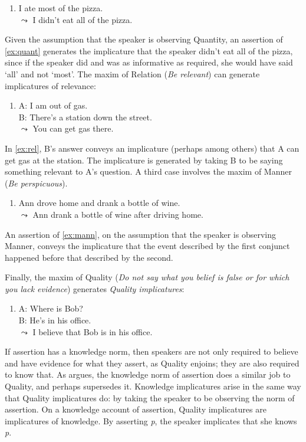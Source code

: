 \documentclass[12pt]{article}
\begin{document}
\begin{enumerate}[resume]
  \item\label{ex:quant}
  I ate most of the pizza.\\
  $\leadsto$ I didn't eat all of the pizza.
\end{enumerate}
%
Given the assumption that the speaker is observing Quantity, an assertion of \ref{ex:quant} generates the implicature that the speaker didn't eat all of the pizza, since if the speaker did and was as informative as required, she would have said `all' and not `most'. The maxim of Relation (\textit{Be relevant}) can generate implicatures of relevance:

\begin{enumerate}[resume]
  \item\label{ex:rel}
    A: I am out of gas.\\
    B: There's a station down the street.\\
    $\leadsto$ You can get gas there.
\end{enumerate}
%
In \ref{ex:rel}, B's answer conveys an implicature (perhaps among others) that A can get gas at the station. The implicature is generated by taking B to be saying something relevant to A's question. A third case involves the maxim of Manner (\textit{Be perspicuous}).

\begin{enumerate}[resume]
  \item\label{ex:mann}
    Ann drove home and drank a bottle of wine.\\
    $\leadsto$ Ann drank a bottle of wine after driving home.
\end{enumerate}
%
An assertion of \ref{ex:mann}, on the assumption that the speaker is observing Manner, conveys the implicature that the event described by the first conjunct happened before that described by the second.

Finally, the maxim of Quality (\textit{Do not say what you belief is false or for which you lack evidence}) generates \textit{Quality implicatures}:

\begin{enumerate}[resume]
  \item\label{ex:qual}
    A: Where is Bob?\\
    B: He's in his office.\\
    $\leadsto$ I believe that Bob is in his office.
\end{enumerate}
%
If assertion has a knowledge norm, then speakers are not only required to believe and have evidence for what they assert, as Quality enjoins; they are also required to know that. As \textcite{benton_gricean_2016} argues, the knowledge norm of assertion does a similar job to Quality, and perhaps supersedes it. Knowledge implicatures arise in the same way that Quality implicatures do: by taking the speaker to be observing the norm of assertion. On a knowledge account of assertion, Quality implicatures are implicatures of knowledge. By asserting \textit{p}, the speaker implicates that she knows \textit{p}.
\end{document}
